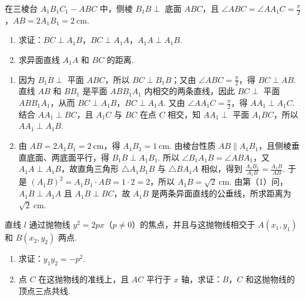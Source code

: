 \documentclass[UTF8,a4paper,oneside,11pt]{ctexbook}
\begin{document}
\begin{problem}
在三棱台 \(A_{1}B_{1}C_{1}-ABC\) 中，侧棱 \(B_{1}B\perp\) 底面 \(ABC\)，且 \(\angle ABC=\angle AA_{1}C=\frac\pi2\)，\(AB=2A_{1}B_{1}=2\mathrm{~cm}\).
\begin{enumerate}
\item 求证：\(BC\perp A_{1}B\)，\(BC\perp A_{1}A\)，\(A_{1}A\perp A_{1}B\).
\item 求异面直线 \(A_{1}A\) 和 \(BC\) 的距离.
\end{enumerate}
\end{problem}

\begin{solution}
\begin{enumerate}
\item
因为 \(B_{1}B\perp\) 平面 \(ABC\)，所以 \(BC\perp B_{1}B\)；又由 \(\angle ABC=\frac\pi2\)，得 \(BC\perp AB\). 直线 \(AB\) 和 \(BB_{1}\) 是平面 \(ABB_{1}A_{1}\) 内相交的两条直线，因此 \(BC\perp\) 平面 \(ABB_{1}A_{1}\)，从而 \(BC\perp A_{1}B\)，\(BC\perp A_{1}A\).
又由 \(\angle AA_{1}C=\frac\pi2\)，得 \(AA_{1}\perp A_{1}C\). 结合 \(AA_{1}\perp BC\)，且 \(A_{1}C\) 与 \(BC\) 在点 \(C\) 相交，知 \(AA_{1}\perp\) 平面 \(A_{1}BC\)，所以 \(AA_{1}\perp A_{1}B\).
\item
由 \(AB=2A_{1}B_{1}=2\mathrm{~cm}\)，得 \(A_{1}B_{1}=1\mathrm{~cm}\). 由棱台性质 \(AB\parallel A_{1}B_{1}\)，且侧棱垂直底面、两底面平行，得 \(B_{1}B\perp A_{1}B_{1}\). 所以 \(\angle B_{1}A_{1}B=\angle ABA_{1}\)，又 \(A_{1}A\perp A_{1}B\)，故直角三角形 \(\triangle A_{1}B_{1}B\) 与 \(\triangle BA_{1}A\) 相似，得到 \(\frac{A_{1}B_{1}}{A_{1}B}=\frac{A_{1}B}{AB}\). 于是 \((A_{1}B)^{2}=A_{1}B_{1}\cdot AB=1\cdot2=2\)，所以 \(A_{1}B=\sqrt2\mathrm{~cm}\).
由第（1）问，\(A_{1}B\perp A_{1}A\) 且 \(A_{1}B\perp BC\)，故 \(A_{1}B\) 是两条异面直线的公垂线，所求距离为 \(\sqrt2\mathrm{~cm}\).
\end{enumerate}
\end{solution}

\begin{problem}
直线 \(l\) 通过抛物线 \(y^{2}=2px\)（\(p\neq0\)）的焦点，并且与这抛物线相交于 \(A(x_{1},y_{1})\) 和 \(B(x_{2},y_{2})\) 两点.
\begin{enumerate}
\item 求证：\(y_{1}y_{2}=-p^{2}\).
\item 点 \(C\) 在这抛物线的准线上，且 \(AC\) 平行于 \(x\) 轴，求证：\(B\)，\(C\) 和这抛物线的顶点三点共线.
\end{enumerate}
\end{problem}
\end{document}
